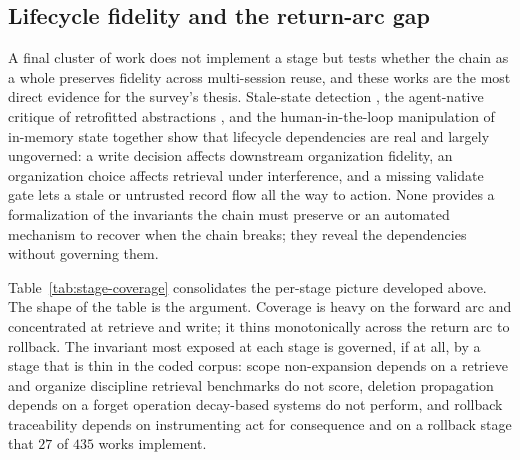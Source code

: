 \subsection{Lifecycle fidelity and the return-arc gap}\label{subsec:fidelity}

A final cluster of work does not implement a stage but tests whether the chain as a whole preserves fidelity across multi-session reuse, and these works are the most direct evidence for the survey's thesis. Stale-state detection \citep{chao2026stalellmagentsknow}, the agent-native critique of retrofitted abstractions \citep{zhou2026agentnative}, and the human-in-the-loop manipulation of in-memory state \citep{huang2023memorysandbox} together show that lifecycle dependencies are real and largely ungoverned: a write decision affects downstream organization fidelity, an organization choice affects retrieval under interference, and a missing validate gate lets a stale or untrusted record flow all the way to action. None provides a formalization of the invariants the chain must preserve or an automated mechanism to recover when the chain breaks; they reveal the dependencies without governing them.

Table~\ref{tab:stage-coverage} consolidates the per-stage picture developed above. The shape of the table is the argument. Coverage is heavy on the forward arc and concentrated at retrieve and write; it thins monotonically across the return arc to rollback. The invariant most exposed at each stage is governed, if at all, by a stage that is thin in the coded corpus: scope non-expansion depends on a retrieve and organize discipline retrieval benchmarks do not score, deletion propagation depends on a forget operation decay-based systems do not perform, and rollback traceability depends on instrumenting act for consequence and on a rollback stage that $27$ of $435$ works implement.

